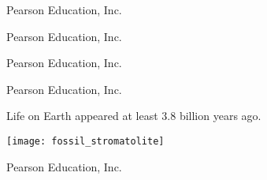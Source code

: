\documentclass[t]{beamer}
\begin{document}
%
{
\begin{frame}[b]
\hfill \tiny \textcopyright Pearson Education, Inc.
\end{frame}
}
%
{
\begin{frame}[b]
\hfill \tiny \textcopyright Pearson Education, Inc.
\end{frame}
}
%
{
\begin{frame}[b]
\hfill \tiny \textcopyright Pearson Education, Inc.
\end{frame}
}
%
{
\begin{frame}[b]
\hfill \tiny \textcopyright Pearson Education, Inc.
\end{frame}
}
%
\begin{frame}[t]{Life on Earth appeared at least 3.8 billion years ago.}

	\texttt{[image: fossil\_stromatolite]}
	
	\vfilll
	
	\hfill \tiny \textcopyright Pearson Education, Inc.
\end{frame}
\end{document}

